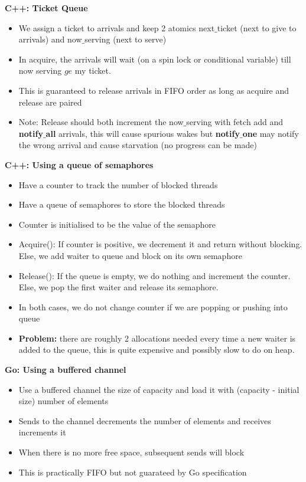 \documentclass[10pt, landscape]{article}
\begin{document}
\begin{multicols}{4}
\textbf{C++: Ticket Queue} \\ 
\begin{itemize}
    \item We assign a ticket to arrivals and keep 2 atomics next$\_$ticket (next to give to arrivals) and now$\_$serving (next to serve)
    \item In acquire, the arrivals will wait (on a spin lock or conditional variable) till now serving $ge$ my ticket. 
    \item This is guaranteed to release arrivals in FIFO order as long as acquire and release are paired 
    \item Note: Release should both increment the now$\_$serving with fetch add and \textbf{notify$\_$all} arrivals, this will cause spurious wakes but \textbf{notify$\_$one} may notify the wrong arrival and cause starvation (no progress can be made)
\end{itemize}

\textbf{C++: Using a queue of semaphores} \\ 
\begin{itemize}
    \item Have a counter to track the number of blocked threads 
    \item Have a queue of semaphores to store the blocked threads
    \item Counter is initialised to be the value of the semaphore 
    \item Acquire(): If counter is positive, we decrement it and return without blocking. Else, we add waiter to queue and block on its own semaphore 
    \item Release(): If the queue is empty, we do nothing and increment the counter. Else, we  pop the first waiter and release its semaphore.
    \item In both cases, we do not change counter if we are popping or pushing into queue
    \item \textbf{Problem:} there are roughly 2 allocations needed every time a new waiter is added to the queue, this is quite expensive and possibly slow to do on heap.
\end{itemize}

\textbf{Go: Using a buffered channel} \\ 
\begin{itemize}
    \item Use a buffered channel the size of capacity and load it with (capacity - initial size) number of elements
    \item Sends to the channel decrements the number of elements and receives increments it 
    \item When there is no more free space, subsequent sends will block
    \item This is practically FIFO but not guarateed by Go specification
\end{itemize}



\end{multicols}
\end{document}
